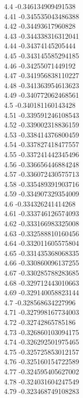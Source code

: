 {4.4	-0.346134909491538\\
4.41	-0.345535043486388\\
4.42	-0.34493617960828\\
4.43	-0.344338316312041\\
4.44	-0.34374145205444\\
4.45	-0.343145585294185\\
4.46	-0.34255071449192\\
4.47	-0.341956838110227\\
4.48	-0.341363954613623\\
4.49	-0.340772062468561\\
4.5	-0.340181160143428\\
4.51	-0.339591246108543\\
4.52	-0.339002318836159\\
4.53	-0.338414376800459\\
4.54	-0.337827418477557\\
4.55	-0.337241442345496\\
4.56	-0.336656446884248\\
4.57	-0.336072430575713\\
4.58	-0.335489391903716\\
4.59	-0.334907329354009\\
4.6	-0.334326241414268\\
4.61	-0.333746126574093\\
4.62	-0.333166983325008\\
4.63	-0.332588810160456\\
4.64	-0.332011605575804\\
4.65	-0.331435368068335\\
4.66	-0.330860096137255\\
4.67	-0.330285788283685\\
4.68	-0.329712443010663\\
4.69	-0.329140058823144\\
4.7	-0.328568634227996\\
4.71	-0.327998167734003\\
4.72	-0.32742865785186\\
4.73	-0.326860103094175\\
4.74	-0.326292501975465\\
4.75	-0.325725853012157\\
4.76	-0.325160154722589\\
4.77	-0.324595405627002\\
4.78	-0.324031604247549\\
4.79	-0.323468749108283\\
}
